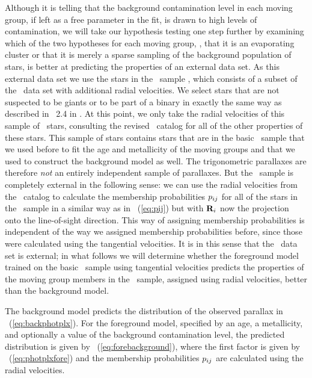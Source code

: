 Although it is telling that the background contamination level in each
moving group, if left as a free parameter in the fit, is drawn to high
levels of contamination, we will take our hypothesis testing one step
further by examining which of the two hypotheses for each moving
group, \ie, that it is an evaporating cluster or that it is merely a
sparse sampling of the background population of stars, is better at
predicting the properties of an external data set. As this external
data set we use the stars in the \gcsabb\ sample
\citep{2004A&A...418..989N}, which consists of a subset of the
\Hipparcos\ data set with additional radial velocities. We select
stars that are not suspected to be giants or to be part of a binary in
exactly the same way as described in \sectionname~2.4 in \bhr. At this
point, we only take the radial velocities of this sample of
\ngcsstarsSSP\ stars, consulting the revised \Hipparcos\ catalog
\citep{2007ASSL..250.....V} for all of the other properties of these
stars. This sample of stars contains stars that are in the basic
\Hipparcos\ sample that we used before to fit the age and metallicity
of the moving groups and that we used to construct the background
model as well. The trigonometric parallaxes are therefore \emph{not}
an entirely independent sample of parallaxes. But the \gcsabb\ sample
is completely external in the following sense: we can use the radial
velocities from the \gcsabb\ catalog to calculate the membership
probabilities $p_{ij}$ for all of the stars in the \gcsabb\ sample in a
similar way as in \eqnname~(\ref{eq:pij}) but with $\mathbf{R}_i$ now the
projection onto the line-of-sight direction. This way of assigning
membership probabilities is independent of the way we assigned
membership probabilities before, since those were calculated using the
tangential velocities. It is in this sense that the \gcsabb\ data set
is external; in what follows we will determine whether the foreground
model trained on the basic \Hipparcos\ sample using tangential
velocities predicts the properties of the moving group members in the
\gcsabb\ sample, assigned using radial velocities, better than the
background model.

The background model predicts the distribution of the observed
parallax in \eqnname~(\ref{eq:backphotplx}). For the foreground model,
specified by an age, a metallicity, and optionally a value of the
background contamination level, the predicted distribution is given by
\eqnname~(\ref{eq:forebackground}), where the first factor is given by
\eqnname~(\ref{eq:photplxfore}) and the membership probabilities
$p_{ij}$ are calculated using the radial velocities.

